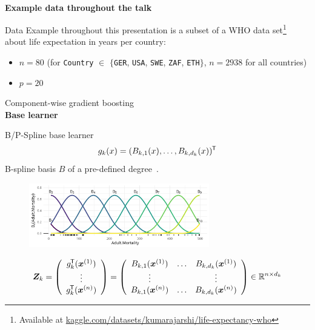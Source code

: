 \documentclass[t,10pt]{beamer}
\newcommand{\fSlide}[2]{
\begin{frame}[plain]{}%
  \vspace{4cm}%
  \Large #1\\[0.2cm]%
  {\LARGE\textbf{#2}}%
	\addtocounter{framenumber}{-1}%
\end{frame}%
}
\begin{document}
\fSlide{\phantom{x}}{Example data throughout the talk}

\begin{frame}{Data}
  Example throughout this presentation is a subset of a WHO data set\footnote[frame,1]{Available at \url{kaggle.com/datasets/kumarajarshi/life-expectancy-who}} about life expectation in years per country:

  \scriptsize
  
  \normalsize
  \begin{itemize}
      \item  
        $n = 80$ (for \texttt{Country} $\in$ $\{$\texttt{GER}, \texttt{USA}, \texttt{SWE}, \texttt{ZAF}, \texttt{ETH}$\}$, $n = 2938$ for all countries) 
      \item $p = 20$
  \end{itemize}

\end{frame}

\fSlide{Component-wise gradient boosting}{Base learner}

\begin{frame}{B/P-Spline base learner}
  \vspace{-0.3cm}\[g_k(x) = (B_{k,1}(x), \dots, B_{k,d_k}(x))^\tran\] B-spline basis $B$ of a pre-defined degree~\citep{eilers1996flexible}.
  \begin{center}
    \begin{figure}
      \includegraphics[width=0.7\textwidth]{figures/bs-base/fig-bs0.png}
    \end{figure}
    \vspace{-0.3cm}
    \[
    \design_k = \left(\begin{array}{c}
      g_{k}^\tran(\xi[1]) \\
      \vdots \\
      g_{k}^\tran(\xi[n])
    \end{array}\right) = \left(\begin{array}{ccc}
      B_{k,1}(\xi[1]) & \dots & B_{k,d_k}(\xi[1]) \\
      \vdots &  & \vdots \\
      B_{k,1}(\xi[n]) & \dots & B_{k,d_k}(\xi[n])
    \end{array}\right)\in\R^{n\times d_k}
    \]
  \end{center}

\end{frame}
\end{document}
